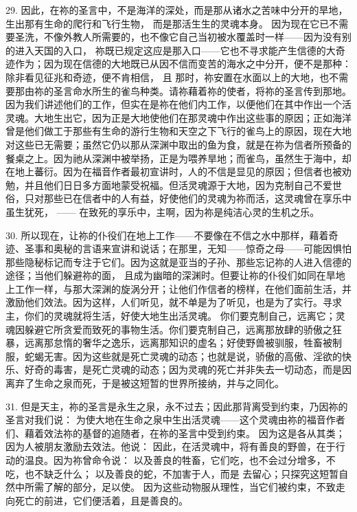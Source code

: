29. 因此，在祢的圣言中，不是海洋的深处，而是那从诸水之苦味中分开的旱地，生出那有生命的爬行和飞行生物， 而是那活生生的灵魂本身。 因为现在它已不需要圣洗，不像外教人所需要的，也不像它自己当初被水覆盖时一样——因为没有别的进入天国的入口， 祢既已规定这应是那入口——它也不寻求能产生信德的大奇迹作为；因为现在信德的大地既已从因不信而变苦的海水之中分开，便不是那种：除非看见征兆和奇迹，便不肯相信， 且 那时，祢安置在水面以上的大地，也不需要那由祢的圣言命水所生的雀鸟种类。请祢藉着祢的使者，将祢的圣言传到那地。因为我们讲述他们的工作，但实在是祢在他们内工作，以便他们在其中作出一个活灵魂。大地生出它，因为正是大地使他们在那灵魂中作出这些事的原因；正如海洋曾是他们做工于那些有生命的游行生物和天空之下飞行的雀鸟上的原因，现在大地对这些已无需要；虽然它仍以那从深渊中取出的鱼为食，就是在祢为信者所预备的餐桌之上。因为祂从深渊中被举扬，正是为喂养旱地；而雀鸟，虽然生于海中，却在地上蕃衍。因为在福音作者最初宣讲时，人的不信是显见的原因；但信者也被劝勉，并且他们日日多方面地蒙受祝福。但活灵魂源于大地，因为克制自己不爱世俗，只对那些已在信者中的人有益，好使他们的灵魂为祢而活，这灵魂曾在享乐中虽生犹死， —— 在致死的享乐中，主啊，因为祢是纯洁心灵的生机之乐。\par

30. 所以现在，让祢的仆役们在地上工作——不要像在不信之水中那样，藉着奇迹、圣事和奥秘的言语来宣讲和说话；在那里，无知——惊奇之母——可能因惧怕那些隐秘标记而专注于它们。因为这就是亚当的子孙、那些忘记祢的人进入信德的途径；当他们躲避祢的面， 且成为幽暗的深渊时。但要让祢的仆役们如同在旱地上工作一样，与那大深渊的旋涡分开；让他们作信者的榜样，在他们面前生活，并激励他们效法。因为这样，人们听见，就不单是为了听见，也是为了实行。寻求主，你们的灵魂就将生活，好使大地生出活灵魂。 你们要克制自己，远离它；灵魂因躲避它所贪爱而致死的事物生活。你们要克制自己，远离那放肆的骄傲之狂暴，远离那怠惰的奢华之逸乐，远离那知识的虚名；好使野兽被驯服，牲畜被制服，蛇蝎无害。因为这些就是死亡灵魂的动态；也就是说，骄傲的高傲、淫欲的快乐、好奇的毒害，是死亡灵魂的动态；因为灵魂的死亡并非失去一切动态，而是因离弃了生命之泉而死，于是被这短暂的世界所接纳，并与之同化。\par

31. 但是天主，祢的圣言是永生之泉，永不过去；因此那背离受到约束，乃因祢的圣言对我们说： 为使大地在生命之泉中生出活灵魂——这个灵魂由祢的福音作者们、藉着效法祢的基督的追随者，在祢的圣言中受到约束。 因为这是各从其类；因为人被朋友激励去效法。他说： 因此，在活灵魂中，将有善良的野兽，在于行动的温良。因为祢曾命令说： 以及善良的牲畜，它们吃，也不会过分增多，不吃，也不缺乏什么； 以及善良的蛇，不加害于人，而是 去留心；只探究这短暂自然中所需了解的部分，足以使。 因为这些动物服从理性，当它们被约束，不致走向死亡的前进，它们便活着，且是善良的。\par

